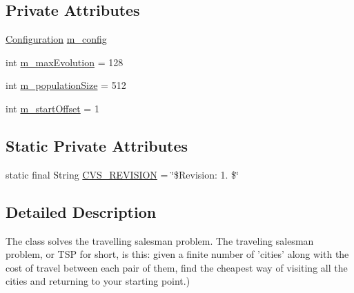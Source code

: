 \subsection*{Private Attributes}
\begin{DoxyCompactItemize}
\item 
\hyperlink{classorg_1_1jgap_1_1_configuration}{Configuration} \hyperlink{classorg_1_1jgap_1_1impl_1_1salesman_1_1_salesman_afcb5455ce482f8d5c76d0f2d882022f9}{m\-\_\-config}
\item 
int \hyperlink{classorg_1_1jgap_1_1impl_1_1salesman_1_1_salesman_a6b0dae8b40df55bd71370761005d0bee}{m\-\_\-max\-Evolution} = 128
\item 
int \hyperlink{classorg_1_1jgap_1_1impl_1_1salesman_1_1_salesman_a3af54d1b6aa53b23cab72f0cdf0bf41e}{m\-\_\-population\-Size} = 512
\item 
int \hyperlink{classorg_1_1jgap_1_1impl_1_1salesman_1_1_salesman_a2b3a133e0be2cd885c11ef899563f816}{m\-\_\-start\-Offset} = 1
\end{DoxyCompactItemize}
\subsection*{Static Private Attributes}
\begin{DoxyCompactItemize}
\item 
static final String \hyperlink{classorg_1_1jgap_1_1impl_1_1salesman_1_1_salesman_a2dfecb0dafceaa67235b2958f64770dc}{C\-V\-S\-\_\-\-R\-E\-V\-I\-S\-I\-O\-N} = \char`\"{}\$Revision\-: 1. \$\char`\"{}
\end{DoxyCompactItemize}


\subsection{Detailed Description}
The class solves the travelling salesman problem. The traveling salesman problem, or T\-S\-P for short, is this\-: given a finite number of 'cities' along with the cost of travel between each pair of them, find the cheapest way of visiting all the cities and returning to your starting point.)

